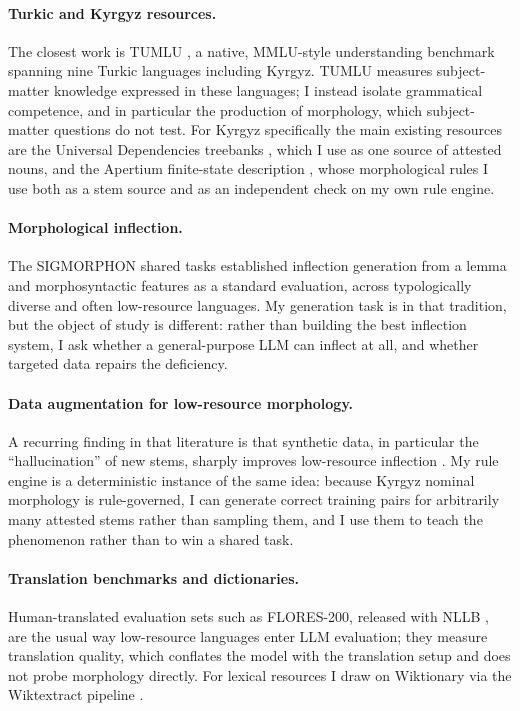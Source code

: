 \documentclass{article}
\begin{document}
\paragraph{Turkic and Kyrgyz resources.}
The closest work is TUMLU \cite{tumlu2025}, a native, MMLU-style understanding
benchmark spanning nine Turkic languages including Kyrgyz. TUMLU measures
subject-matter knowledge expressed in these languages; I instead isolate grammatical
competence, and in particular the production of morphology, which subject-matter
questions do not test. For Kyrgyz specifically the main existing resources are the
Universal Dependencies treebanks \cite{nivre2020ud}, which I use as one source of
attested nouns, and the Apertium finite-state description
\cite{forcada2011apertium,khanna2021apertium}, whose morphological rules I use both
as a stem source and as an independent check on my own rule engine.

\paragraph{Morphological inflection.}
The SIGMORPHON shared tasks \cite{mccarthy2019sigmorphon,vylomova2020sigmorphon}
established inflection generation from a lemma and morphosyntactic features as a
standard evaluation, across typologically diverse and often low-resource languages.
My generation task is in that tradition, but the object of study is different: rather
than building the best inflection system, I ask whether a general-purpose LLM can
inflect at all, and whether targeted data repairs the deficiency.

\paragraph{Data augmentation for low-resource morphology.}
A recurring finding in that literature is that synthetic data, in particular the
``hallucination'' of new stems, sharply improves low-resource inflection
\cite{anastasopoulos2019inflection}. My rule engine is a deterministic instance of
the same idea: because Kyrgyz nominal morphology is rule-governed, I can generate
correct training pairs for arbitrarily many attested stems rather than sampling them,
and I use them to teach the phenomenon rather than to win a shared task.

\paragraph{Translation benchmarks and dictionaries.}
Human-translated evaluation sets such as FLORES-200, released with NLLB
\cite{nllb2022}, are the usual way low-resource languages enter LLM evaluation; they
measure translation quality, which conflates the model with the translation setup and
does not probe morphology directly. For lexical resources I draw on Wiktionary via
the Wiktextract pipeline \cite{ylonen2022wiktextract}.
\end{document}
